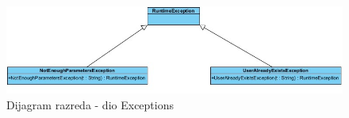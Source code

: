 				\begin{figure}[H]
					\includegraphics[width=\textwidth]{slike/exception.jpg} %
					\centering
					\caption{Dijagram razreda - dio Exceptions}
					\label{fig:promjene}
				\end{figure}

